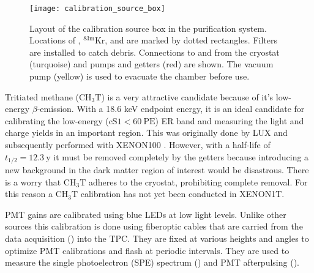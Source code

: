 \begin{figure}
\centering
\texttt{[image: calibration\_source\_box]}
\caption{Layout of the calibration source box in the purification system.  Locations of , $^{83\mathrm{m}}\mathrm{Kr}$, and
 are marked by dotted rectangles.  Filters are installed to catch debris.  Connections to and from the cryostat (turquoise)
and pumps and getters (red) are shown.  The vacuum pump (yellow) is used to evacuate the chamber before use.}
\label{fig:xenon1t_pur_cal_box_schematic}
\end{figure}

Tritiated methane ($\mathrm{C H_3 T}$) is a very attractive candidate because of it's low-energy $\beta$-emission.  With a 18.6 keV
endpoint energy, it is an ideal candidate for calibrating the low-energy ($\mathrm{cS1} < 60\ \mathrm{PE}$) ER band
and measuring
the light and charge yields in an important region.  This was originally done by LUX  and
subsequently performed with XENON100 .  However, with a half-life of $t_{1/2} = 12.3\ \mathrm{y}$ it must be
removed completely by the getters because introducing a new background in the dark matter region of interest would be disastrous.  There
is a worry that
$\mathrm{C H_3 T}$ adheres to the cryostat, prohibiting complete removal.  For this reason a $\mathrm{C H_3 T}$ calibration has not
yet been conducted in XENON1T.

PMT gains are calibrated using blue LEDs at low light levels.  Unlike other sources this calibration is done using fiberoptic cables that
are
carried from the data acquisition () into the TPC.  They are fixed at various heights and angles to optimize
PMT calibrations and flash at periodic intervals.  They are used to measure the single photoelectron (SPE) spectrum
() and PMT afterpulsing ().

